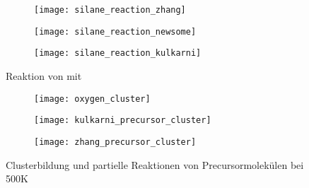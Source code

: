 \begin{figure}[!ht]

  \captionsetup[subfigure]{singlelinecheck=false}
  \def\subfigwidth{0.32\textwidth}
  \begin{subfigure}[t]{3cm}
    \texttt{[image: silane\_reaction\_zhang]}
  \end{subfigure}
  \hfill
  \begin{subfigure}[t]{5cm}
    \texttt{[image: silane\_reaction\_newsome]}
  \end{subfigure}
  \hfill
  \begin{subfigure}[t]{4.5cm}
    \texttt{[image: silane\_reaction\_kulkarni]}
  \end{subfigure}

  \caption[Reaktionen von  mit ]{
    Reaktion von  mit 
  }
  \label{fig:precursorreactions}

\end{figure}

\begin{figure}[!ht]

  \captionsetup[subfigure]{singlelinecheck=false}
  \begin{subfigure}[t]{4cm}
    \texttt{[image: oxygen\_cluster]}
  \end{subfigure}
  \hfill
  \begin{subfigure}[t]{5.5cm}
    \texttt{[image: kulkarni\_precursor\_cluster]}
  \end{subfigure}
  \hfill
  \begin{subfigure}[t]{4.5cm}
    \texttt{[image: zhang\_precursor\_cluster]}
  \end{subfigure}

  \caption[Cluster von Precursormolekülen]{Clusterbildung und partielle Reaktionen von Precursormolekülen bei 500K}
  \label{fig:precursorclusters}

\end{figure}
